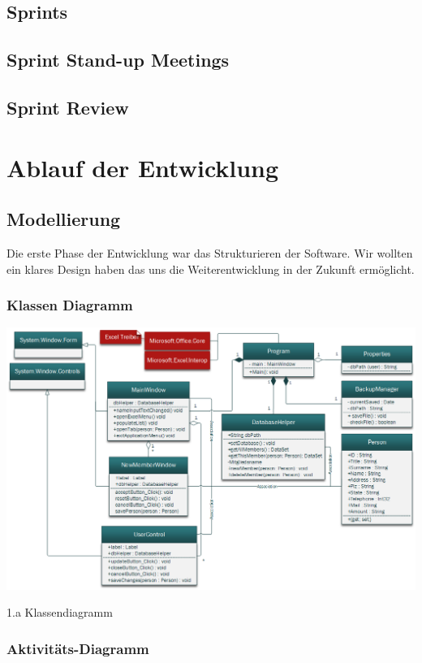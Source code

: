 \documentclass{article}
\begin{document}
\subsection{Sprints}
\subsection{Sprint Stand-up Meetings}
\subsection{Sprint Review}

\newpage

\section{Ablauf der Entwicklung}

\subsection{Modellierung}
Die erste Phase der Entwicklung war das Strukturieren der Software. Wir wollten ein klares Design haben das uns die Weiterentwicklung in der Zukunft ermöglicht. 

\subsubsection{Klassen Diagramm}
\begin{center}
	\includegraphics[width=1.05 \textwidth]{KlassendiagrammBild}
	\caption{1.a Klassendiagramm}
\end{center}

\subsubsection{Aktivitäts-Diagramm}
\end{document}
